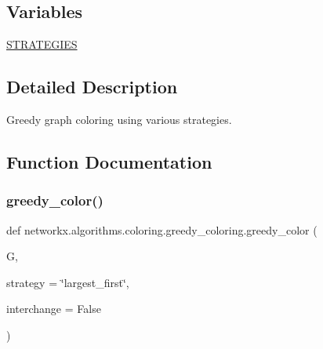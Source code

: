 \subsection*{Variables}
\begin{DoxyCompactItemize}
\item 
\hyperlink{namespacenetworkx_1_1algorithms_1_1coloring_1_1greedy__coloring_a23e5a17ce4b85e1b4d439f4f9df0dcb7}{S\+T\+R\+A\+T\+E\+G\+I\+ES}
\end{DoxyCompactItemize}


\subsection{Detailed Description}
\begin{DoxyVerb}Greedy graph coloring using various strategies.
\end{DoxyVerb}
 

\subsection{Function Documentation}
\mbox{\label{namespacenetworkx_1_1algorithms_1_1coloring_1_1greedy__coloring_aa77dd5672fb54a952ace2eae70899eb1}} 
\subsubsection{\texorpdfstring{greedy\+\_\+color()}{greedy\_color()}}
{\footnotesize\ttfamily def networkx.\+algorithms.\+coloring.\+greedy\+\_\+coloring.\+greedy\+\_\+color (\begin{DoxyParamCaption}\item[{}]{G,  }\item[{}]{strategy = {\ttfamily \char`\"{}largest\+\_\+first\char`\"{}},  }\item[{}]{interchange = {\ttfamily False} }\end{DoxyParamCaption})}

